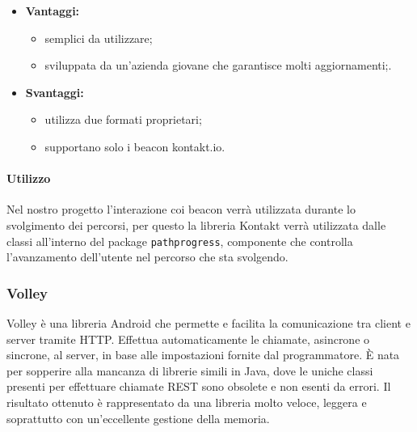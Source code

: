 	\begin{itemize}
		\item \textbf{Vantaggi:}
			\begin{itemize}
				\item semplici da utilizzare;
				\item sviluppata da un'azienda giovane che garantisce molti aggiornamenti;.
			\end{itemize}
		\item \textbf{Svantaggi:}
			\begin{itemize}
				\item utilizza due formati proprietari;
				\item supportano solo i beacon kontakt.io.
			\end{itemize}
	\end{itemize}
	\paragraph{Utilizzo}
	Nel nostro progetto l'interazione coi beacon verrà utilizzata durante lo svolgimento dei percorsi, per questo la libreria Kontakt verrà utilizzata dalle classi all'interno del package \texttt{pathprogress}, componente che controlla l'avanzamento dell'utente nel percorso che sta svolgendo.
		
\subsubsection{Volley}
Volley è una libreria Android che permette e facilita la comunicazione tra client e server tramite HTTP. Effettua automaticamente le chiamate, asincrone o sincrone, al server, in base alle impostazioni fornite dal programmatore. È nata per sopperire alla mancanza di librerie simili in Java, dove le uniche classi presenti per effettuare chiamate REST sono obsolete e non esenti da errori. Il risultato ottenuto è rappresentato da una libreria molto veloce, leggera e soprattutto con un'eccellente gestione della memoria.

